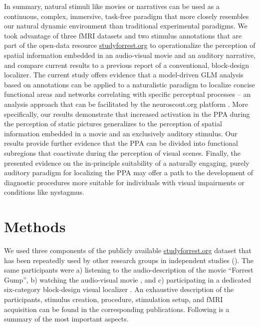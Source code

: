 \documentclass[english,11pt]{article}
\begin{document}
In summary, natural stimuli like movies \citep{eickhoff2020towards,
hasson2008neurocinematics, sonkusare2019naturalistic} or narratives
\citep{hamilton2018revolution, honey2012not, lerner2011topographic,
silbert2014coupled, wilson2008beyond} can be used as a continuous, complex,
immersive, task-free paradigm that more closely resembles our natural dynamic
environment than traditional experimental paradigms.
We took advantage of three fMRI datasets and two stimulus annotations that are
part of the open-data resource
\href{http://www.studyforrest.org}{studyforrest.org} to operationalize the
perception of spatial information embedded in an audio-visual movie and an
auditory narrative, and compare current results to a previous report of a
conventional, block-design localizer.
The current study offers evidence that a model-driven GLM analysis based on
annotations can be applied to a naturalistic paradigm to localize concise
functional areas and networks correlating with specific perceptual processes
-- an analysis approach that can be facilitated by the neuroscout.org platform
\citep{delavega2021neuroscout}.
More specifically, our results demonstrate that increased activation in the PPA
during the perception of static pictures generalizes to the perception of
spatial information embedded in a movie and an exclusively auditory stimulus.
Our results provide further evidence that the PPA can be divided into
functional subregions that coactivate during the perception of visual scenes.
Finally, the presented evidence on the in-principle suitability of a naturally
engaging, purely auditory paradigm for localizing the PPA may offer a path to
the development of diagnostic procedures more suitable for individuals with
visual impairments or conditions like nystagmus.


\section*{Methods}


We used three components of the publicly available
\href{http://www.studyforrest.org}{studyforrest.org} dataset that has
been repeatedly used by other research groups in independent studies
(\citep[e.g.,][]{ben2018hippocampal, jiahui2019predicting, hu2017decoding,
lettieri2019emotionotopy, nguyen2016integration}).
The same participants were
a) listening to the audio-description \citep{hanke2014audiomovie} of
the movie ``Forrest Gump'',
b) watching the audio-visual movie \citep{hanke2016simultaneous}, and
c) participating in a dedicated six-category block-design visual localizer \citep{sengupta2016extension}.
An exhaustive description of the participants, stimulus creation, procedure,
stimulation setup, and fMRI acquisition can be found in the corresponding
publications. Following is a summary of the most important aspects.
\end{document}
